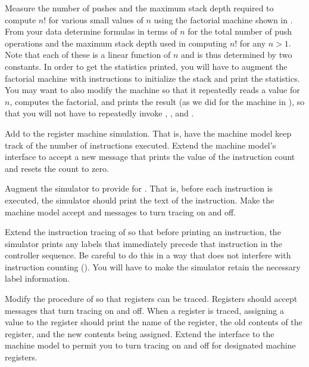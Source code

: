 \begin{exerciseGroup}
\label{Exercise 5.14}
 Measure the number of pushes and
the maximum stack depth required to compute \( n! \) for various small values of
\( n \) using the factorial machine shown in .  From your data
determine formulas in terms of \( n \) for the total number of push operations
and the maximum stack depth used in computing \( n! \) for any \( n > 1 \). Note
that each of these is a linear function of \( n \) and is thus determined by two
constants.  In order to get the statistics printed, you will have to augment
the factorial machine with instructions to initialize the stack and print the
statistics.  You may want to also modify the machine so that it repeatedly
reads a value for \( n \), computes the factorial, and prints the result (as we
did for the  machine in ), so that you will not
have to repeatedly invoke ,
, and .

\label{Exercise 5.15}
 Add  to the register machine simulation.  That is, have the machine model
keep track of the number of instructions executed.  Extend the machine model's
interface to accept a new message that prints the value of the instruction
count and resets the count to zero.

\label{Exercise 5.16}
 Augment the simulator to provide
for .  That is, before each instruction is
executed, the simulator should print the text of the instruction.  Make the
machine model accept  and  messages to turn
tracing on and off.

\label{Exercise 5.17}
 Extend the instruction tracing of
 so that before printing an instruction, the simulator
prints any labels that immediately precede that instruction in the controller
sequence.  Be careful to do this in a way that does not interfere with
instruction counting ().  You will have to make the
simulator retain the necessary label information.

\label{Exercise 5.18}
 Modify the 
procedure of  so that registers can be traced.  Registers
should accept messages that turn tracing on and off.  When a register is
traced, assigning a value to the register should print the name of the
register, the old contents of the register, and the new contents being
assigned.  Extend the interface to the machine model to permit you to turn
tracing on and off for designated machine registers.


\end{exerciseGroup}
